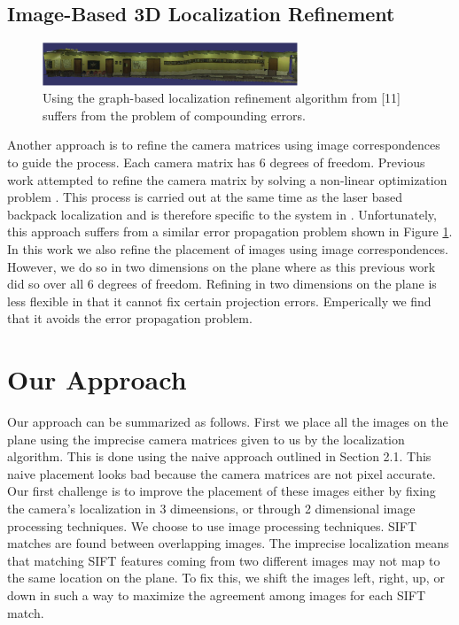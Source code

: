 \documentclass[runningheads]{llncs}
\begin{document}
\subsection{Image-Based 3D Localization Refinement}

\begin{figure}
\centering
\includegraphics[width=3in]{Graph_crop.pdf}
\caption{Using the graph-based localization refinement algorithm from [11] suffers from the problem of compounding errors. }
\label{fig:graph}
\end{figure}

Another approach is to refine the camera matrices using image correspondences to guide the process. Each camera matrix has 6 degrees of freedom. Previous work attempted to refine the camera matrix by solving a non-linear optimization problem \cite{liu2010indoor}. This process is carried out at the same time as the laser based backpack localization and is therefore specific to the system in \cite{liu2010indoor,chen2010indoor}. Unfortunately, this approach suffers from a similar error propagation problem shown in Figure \ref{fig:graph}. In this work we also refine the placement of images using image correspondences. However, we do so in two dimensions on the plane where as this previous work did so over all 6 degrees of freedom. Refining in two dimensions on the plane is less flexible in that it cannot fix certain projection errors. Emperically we find that it avoids the error propagation problem.

\section{Our Approach}
\label{sec:approach}

Our approach can be summarized as follows. First we place all the images on the plane using the imprecise camera matrices given to us by the localization algorithm. This is done using the naive approach outlined in Section 2.1. This naive placement looks bad because the camera matrices are not pixel accurate. Our first challenge is to improve the placement of these images either by fixing the camera's localization in 3 dimeensions, or through 2 dimensional image processing techniques. We choose to use image processing techniques. SIFT matches are found between overlapping images. The imprecise localization means that matching SIFT features coming from two different images may not map to the same location on the plane. To fix this, we shift the images left, right, up, or down in such a way to maximize the agreement among images for each SIFT match. 
\end{document}

